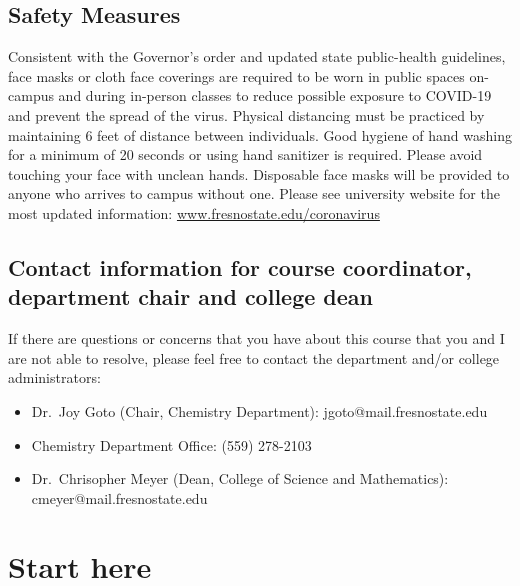 \hypertarget{safety-measures}{%
\subsection{Safety Measures}\label{safety-measures}}

Consistent with the Governor's order and updated state public-health
guidelines, face masks or cloth face coverings are required to be worn
in public spaces on-campus and during in-person classes to reduce
possible exposure to COVID-19 and prevent the spread of the virus.
Physical distancing must be practiced by maintaining 6 feet of distance
between individuals. Good hygiene of hand washing for a minimum of 20
seconds or using hand sanitizer is required. Please avoid touching your
face with unclean hands. Disposable face masks will be provided to
anyone who arrives to campus without one. Please see university website
for the most updated information:
\href{http://www.fresnostate.edu/president/coronavirus/index.html}{www.fresnostate.edu/coronavirus}

\hypertarget{contact-information-for-course-coordinator-department-chair-and-college-dean}{%
\subsection{Contact information for course coordinator, department chair
and college
dean}\label{contact-information-for-course-coordinator-department-chair-and-college-dean}}

If there are questions or concerns that you have about this course that
you and I are not able to resolve, please feel free to contact the
department and/or college administrators:

\begin{itemize}
\tightlist
\item
  Dr.~Joy Goto (Chair, Chemistry Department): jgoto@mail.fresnostate.edu
\item
  Chemistry Department Office: (559) 278-2103
\item
  Dr.~Chrisopher Meyer (Dean, College of Science and Mathematics):
  cmeyer@mail.fresnostate.edu
\end{itemize}

\newpage

\hypertarget{start-here}{%
\section{Start here}\label{start-here}}

